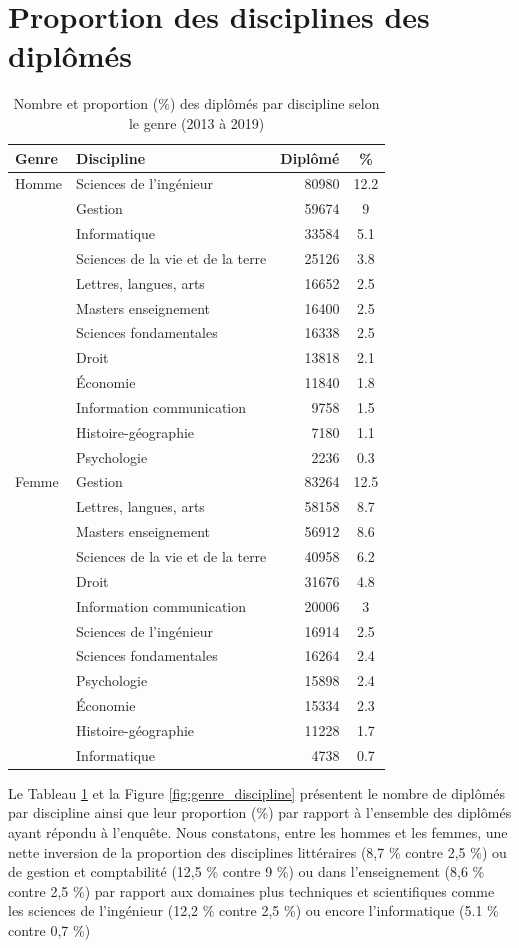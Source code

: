 \documentclass[12pt, a4paper, titlepage, table]{article}
\begin{document}
\section{Proportion des disciplines des diplômés}
	\begin{table}[H]
		\centering
		\begin{tabular}{llrc}
			\toprule
			\textbf{Genre} & \textbf{Discipline} & \textbf{Diplômé} & \textbf{\%} \\
			\midrule
			Homme & Sciences de l'ingénieur & 80980 & 12.2 \\
			& Gestion & 59674 & 9 \\
			& Informatique & 33584 & 5.1 \\
			& Sciences de la vie et de la terre & 25126 & 3.8 \\
			& Lettres, langues, arts & 16652 & 2.5 \\
			& Masters enseignement & 16400 & 2.5 \\
			& Sciences fondamentales & 16338 & 2.5 \\
			& Droit & 13818 & 2.1 \\
			& Économie & 11840 & 1.8 \\
			& Information communication & 9758 & 1.5 \\
			& Histoire-géographie & 7180 & 1.1 \\
			& Psychologie & 2236 & 0.3 \\
			\midrule
			Femme & Gestion & 83264 & 12.5 \\
			& Lettres, langues, arts & 58158 & 8.7 \\
			& Masters enseignement & 56912 & 8.6 \\
			& Sciences de la vie et de la terre & 40958 & 6.2 \\
			& Droit & 31676 & 4.8 \\
			& Information communication & 20006 & 3 \\
			& Sciences de l'ingénieur & 16914 & 2.5 \\
			& Sciences fondamentales & 16264 & 2.4 \\
			& Psychologie & 15898 & 2.4 \\
			& Économie & 15334 & 2.3 \\
			& Histoire-géographie & 11228 & 1.7 \\
			& Informatique & 4738 & 0.7 \\
			\bottomrule
		\end{tabular}
		\caption{Nombre et proportion (\%) des diplômés par discipline selon le genre (2013 à 2019)}
		\label{tab:genre_discipline}
	\end{table}
	Le Tableau \ref{tab:genre_discipline} et la Figure \ref{fig:genre_discipline} présentent le nombre de diplômés par discipline ainsi que leur proportion (\%) par rapport à l'ensemble des diplômés ayant répondu à l'enquête.
	Nous constatons, entre les hommes et les femmes,  une nette inversion de la proportion des disciplines  littéraires (8,7 \% contre 2,5 \%) ou de gestion et comptabilité (12,5 \% contre 9 \%) ou dans l'enseignement (8,6 \% contre 2,5 \%) par rapport aux domaines plus techniques et scientifiques comme les sciences de l'ingénieur (12,2 \% contre 2,5 \%) ou encore l'informatique (5.1 \% contre 0,7 \%)
\end{document}
